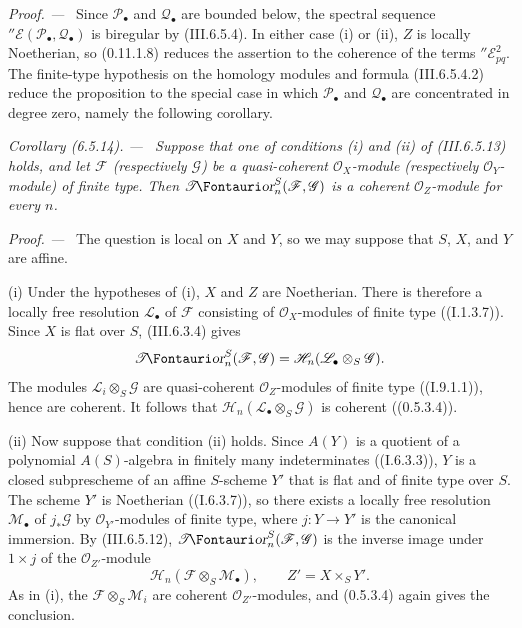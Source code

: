 \documentclass[10pt,oneside]{book}
\newcommand{\sh}[1]{\mathscr{#1}}
\newcommand{\shTor}{\sh{T}\textup{\kern-2.2pt{\Fontauri\slshape or}}}
\newcommand{\sref}[2][]{(#2)}
\newenvironment{corollary}[1][]{\par\medskip\noindent\itshape Corollary (#1). ---\ }{\par}
\newenvironment{proof}{\par\medskip\noindent\textit{Proof. ---\ }}{\par}
\begin{document}
\begin{proof}
Since $\sh P_\bullet$ and $\sh Q_\bullet$ are bounded below, the
spectral sequence
$''\sh E(\sh P_\bullet,\sh Q_\bullet)$ is biregular by
\sref{III.6.5.4}.  In either case (i) or (ii), $Z$ is locally
Noetherian, so \sref[0]{0.11.1.8} reduces the assertion to the
coherence of the terms $''\sh E_{pq}^2$.  The finite-type
hypothesis on the homology modules and formula
\sref{III.6.5.4.2} reduce the proposition to the special case in
which $\sh P_\bullet$ and $\sh Q_\bullet$ are concentrated in
degree zero, namely the following corollary.
\end{proof}

\begin{corollary}[6.5.14]
\label{III.6.5.14}
Suppose that one of conditions \emph{(i)} and \emph{(ii)} of
\sref{III.6.5.13} holds, and let $\sh F$ (respectively $\sh G$)
be a quasi-coherent $\sh O_X$-module (respectively
$\sh O_Y$-module) of finite type.  Then
$\shTor_n^S(\sh F,\sh G)$ is a coherent $\sh O_Z$-module for
every $n$.
\end{corollary}

\begin{proof}
The question is local on $X$ and $Y$, so we may suppose that
$S$, $X$, and $Y$ are affine.

\textnormal{(i)} Under the hypotheses of (i), $X$ and $Z$
are Noetherian.  There is therefore a locally free resolution
$\sh L_\bullet$ of $\sh F$ consisting of $\sh O_X$-modules of
finite type (\sref[I]{I.1.3.7}).  Since $X$ is flat over $S$,
\sref{III.6.3.4} gives
\[
  \shTor_n^S(\sh F,\sh G)
  =
  \sh H_n(\sh L_\bullet\otimes_S\sh G).
\]
The modules $\sh L_i\otimes_S\sh G$ are quasi-coherent
$\sh O_Z$-modules of finite type (\sref[I]{I.9.1.1}), hence are
coherent.  It follows that
$\sh H_n(\sh L_\bullet\otimes_S\sh G)$ is coherent
(\sref[0]{0.5.3.4}).

\textnormal{(ii)} Now suppose that condition (ii) holds.  Since
$A(Y)$ is a quotient of a polynomial $A(S)$-algebra in finitely
many indeterminates (\sref[I]{I.6.3.3}), $Y$ is a closed
subprescheme of an affine $S$-scheme $Y'$ that is flat and of
finite type over $S$.  The scheme $Y'$ is Noetherian
(\sref[I]{I.6.3.7}), so there exists a locally free resolution
$\sh M_\bullet$ of $j_*\sh G$ by $\sh O_{Y'}$-modules of finite
type, where $j:Y\to Y'$ is the canonical immersion.  By
\sref{III.6.5.12}, $\shTor_n^S(\sh F,\sh G)$ is the inverse image
under $1\times j$ of the $\sh O_{Z'}$-module
\[
  \sh H_n(\sh F\otimes_S\sh M_\bullet),
  \qquad Z'=X\times_SY'.
\]
As in (i), the $\sh F\otimes_S\sh M_i$ are coherent
$\sh O_{Z'}$-modules, and \sref[0]{0.5.3.4} again gives the
conclusion.
\end{proof}
\end{document}
